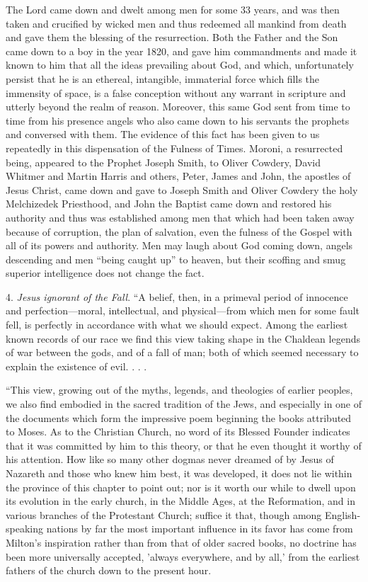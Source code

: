 The Lord came down and dwelt among men for some 33 years, and was then taken and
crucified by wicked men and thus redeemed all mankind from death and gave them the
blessing of the resurrection. Both the Father and the Son came down to a boy in the year
1820, and gave him commandments and made it known to him that all the ideas prevailing
about God, and which, unfortunately persist that he is an ethereal, intangible, immaterial
force which fills the immensity of space, is a false conception without any warrant in
scripture and utterly beyond the realm of reason. Moreover, this same God sent from time to
time from his presence angels who also came down to his servants the prophets and
conversed with them. The evidence of this fact has been given to us repeatedly in this
dispensation of the Fulness of Times. Moroni, a resurrected being, appeared to the Prophet
Joseph Smith, to Oliver Cowdery, David Whitmer and Martin Harris and others, Peter, James
and John, the apostles of Jesus Christ, came down and gave to Joseph Smith and Oliver
Cowdery the holy Melchizedek Priesthood, and John the Baptist came down and restored his
authority and thus was established among men that which had been taken away because of
corruption, the plan of salvation, even the fulness of the Gospel with all of its powers and
authority. Men may laugh about God coming down, angels descending and men ``being
caught up'' to heaven, but their scoffing and smug superior intelligence does not change the
fact.

4. \textit{Jesus ignorant of the Fall}. ``A belief, then, in a primeval period of innocence and
perfection—moral, intellectual, and physical—from which men for some fault fell, is
perfectly in accordance with what we should expect. Among the earliest known records of
our race we find this view taking shape in the Chaldean legends of war between the gods, and
of a fall of man; both of which seemed necessary to explain the existence of evil. . . .

``This view, growing out of the myths, legends, and theologies of earlier peoples, we also find
embodied in the sacred tradition of the Jews, and especially in one of the documents which
form the impressive poem beginning the books attributed to Moses. As to the Christian
Church, no word of its Blessed Founder indicates that it was committed by him to this theory,
or that he even thought it worthy of his attention. How like so many other dogmas never
dreamed of by Jesus of Nazareth and those who knew him best, it was developed, it does not
lie within the province of this chapter to point out; nor is it worth our while to dwell upon its
evolution in the early church, in the Middle Ages, at the Reformation, and in various
branches of the Protestant Church; suffice it that, though among English-speaking nations by
far the most important influence in its favor has come from Milton's inspiration rather than
from that of older sacred books, no doctrine has been more universally accepted, 'always
everywhere, and by all,' from the earliest fathers of the church down to the present hour.

